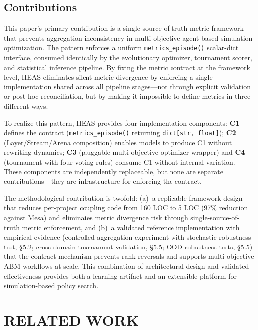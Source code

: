 \documentclass{wscpaperproc}
\begin{document}
\subsection{Contributions}

This paper's primary contribution is a single-source-of-truth metric framework that prevents
aggregation inconsistency in multi-objective agent-based simulation optimization.
The pattern enforces a uniform \texttt{metrics\_episode()} scalar-dict interface,
consumed identically by the evolutionary optimizer, tournament scorer, and statistical
inference pipeline. By fixing the metric contract at the framework level, HEAS
eliminates silent metric divergence by enforcing a single implementation shared across all
pipeline stages---not through explicit validation or post-hoc reconciliation, but by making
it impossible to define metrics in three different ways.

To realize this pattern, HEAS provides four implementation components:
\textbf{C1} defines the contract (\texttt{metrics\_episode()} returning
\texttt{dict[str, float]}); \textbf{C2} (Layer/Stream/Arena composition) enables
models to produce C1 without rewriting dynamics; \textbf{C3} (pluggable multi-objective
optimizer wrapper) and \textbf{C4} (tournament with four voting rules) consume C1
without internal variation. These components are independently replaceable, but none
are separate contributions---they are infrastructure for enforcing the contract.

The methodological contribution is twofold: (a)~a replicable framework design that
reduces per-project coupling code from 160 LOC to 5 LOC (97\% reduction against Mesa)
and eliminates metric divergence risk through single-source-of-truth metric enforcement, and (b)~a validated reference
implementation with empirical evidence (controlled aggregation experiment with stochastic robustness test, \S5.2;
cross-domain tournament validation, \S5.5; OOD robustness tests, \S5.5) that the
contract mechanism prevents rank reversals and supports multi-objective ABM workflows
at scale. This combination of architectural design and validated effectiveness provides
both a learning artifact and an extensible platform for simulation-based policy search.

\section{RELATED WORK}
\end{document}
